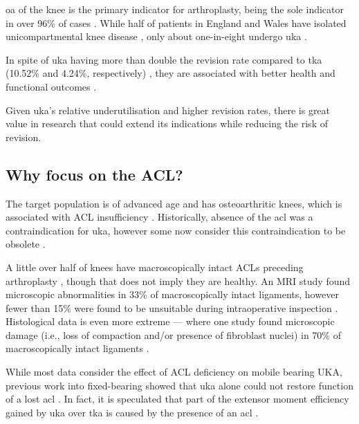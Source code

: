 \Gls{oa} of the knee is the primary indicator for arthroplasty, being the sole indicator in over 96\% of cases \cite{achakri_national_2022}.
While half of patients in England and Wales have isolated unicompartmental knee disease \cite{stoddart_compartmental_2021}, only about one-in-eight undergo \gls{uka} \cite{achakri_national_2022}.

In spite of \gls{uka} having more than double the revision rate compared to \gls{tka} (10.52\% and 4.24\%, respectively) \cite{achakri_national_2022}, they are associated with better health and functional outcomes \cite{liddle_adverse_2014,blevins_postoperative_2020}.

Given \gls{uka}'s relative underutilisation and higher revision rates, there is great value in research that could extend its indications while reducing the risk of revision.

\subsection{Why focus on the ACL?}
The target population is of advanced age and has osteoarthritic knees, which is associated with ACL insufficiency \cite{scott_patterns_2020}. 
Historically, absence of the \gls{acl} was a contraindication for \gls{uka}, however some now consider this contraindication to be obsolete \cite{van_der_list_role_2016}.

A little over half of knees have macroscopically intact ACLs preceding arthroplasty \cite{roussi_anterior_2021}, though that does not imply they are healthy.
An MRI study found microscopic abnormalities in 33\% of macroscopically intact ligaments, however fewer than 15\% were found to be unsuitable during intraoperative inspection \cite{sharpe_magnetic_2001}.
Histological data is even more extreme --- where one study found microscopic damage (i.e., loss of compaction and/or presence of fibroblast nuclei) in 70\% of macroscopically intact ligaments \cite{trompeter_predicting_2009}.

While most data consider the effect of ACL deficiency on mobile bearing UKA, previous work into fixed-bearing showed that \gls{uka} alone could not restore function of a lost \gls{acl} \cite{suggs_knee_2006}.
In fact, it is speculated that part of the extensor moment efficiency gained by \gls{uka} over \gls{tka} is caused by the presence of an \gls{acl} \cite{garner_extensor_2021}.

